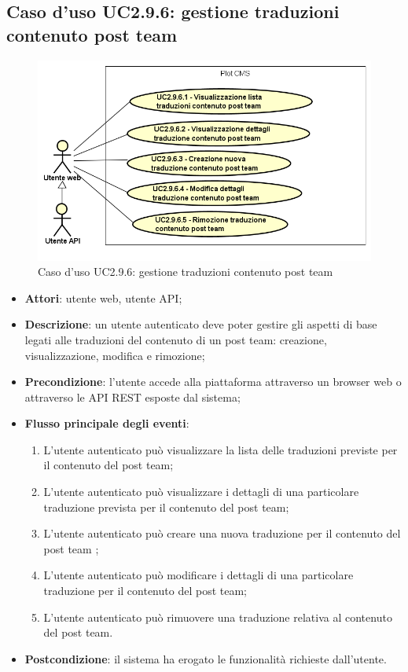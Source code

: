 \subsection{Caso d'uso UC2.9.6: gestione traduzioni contenuto post team}

        \begin{figure}[H]
            \centering
            \includegraphics[scale=0.95, width=\textwidth]{immagini/usecase/UC2-9-6.png}
            \caption{Caso d'uso UC2.9.6: gestione traduzioni contenuto post team}\label{fig:UC2.9.6} 
        \end{figure}
\begin{itemize}
\item \textbf{Attori}: utente web, utente API;
\item \textbf{Descrizione}: un utente autenticato deve poter gestire gli aspetti di base legati alle traduzioni del contenuto di un post team: creazione, visualizzazione, modifica e rimozione; 
      \item \textbf{Precondizione}: l'utente accede alla piattaforma attraverso un browser web o attraverso le API REST esposte dal sistema;

        \item \textbf{Flusso principale degli eventi}:
          \begin{enumerate}
          \item L'utente autenticato può visualizzare la lista delle traduzioni previste per il contenuto del post team;
          \item L'utente autenticato può visualizzare i dettagli di una particolare traduzione prevista per il contenuto del post team;
          \item L'utente autenticato può creare una nuova traduzione per il contenuto del post team ;
          \item L'utente autenticato può modificare i dettagli di una particolare traduzione per il contenuto del post team;
          \item L'utente autenticato può rimuovere una traduzione relativa al contenuto del post team.

      \end{enumerate}
    \item \textbf{Postcondizione}: il sistema ha erogato le funzionalità richieste dall'utente.
  \end{itemize}

